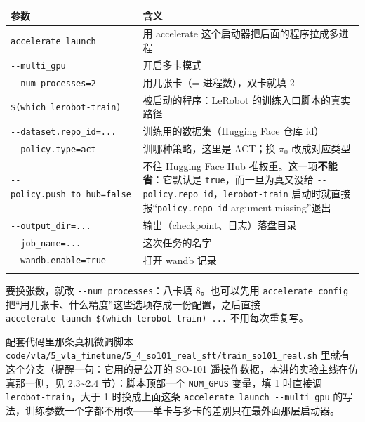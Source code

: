 \documentclass[
  chinese,
]{ctexart}
\begin{document}
\begin{center}
\begin{tabular}{@{}>{\raggedright\arraybackslash}p{} >{\raggedright\arraybackslash}p{}@{}}
\toprule\noalign{}
参数 & 含义 \\
\midrule\noalign{}
\texttt{accelerate\ launch} & 用 accelerate 这个启动器把后面的程序拉成多进程 \\
\texttt{-\/-multi\_\allowbreak gpu} & 开启多卡模式 \\
\texttt{-\/-num\_\allowbreak processes=2} & 用几张卡（= 进程数），双卡就填 2 \\
\texttt{\$(which\ lerobot-train)} & 被启动的程序：LeRobot 的训练入口脚本的真实路径 \\
\texttt{-\/-dataset.repo\_\allowbreak id=...} & 训练用的数据集（Hugging Face 仓库 id） \\
\texttt{-\/-policy.type=act} & 训哪种策略，这里是 ACT；换 \(\pi_0\) 改成对应类型 \\
\texttt{-\/-policy.push\_\allowbreak to\_\allowbreak hub=false} & 不往 Hugging Face Hub 推权重。这一项\textbf{不能省}：它默认是 \texttt{true}，而一旦为真又没给 \texttt{-\/-policy.repo\_\allowbreak id}，\texttt{lerobot-train} 启动时就直接报``\texttt{policy.repo\_\allowbreak id} argument missing''退出 \\
\texttt{-\/-output\_\allowbreak dir=...} & 输出（checkpoint、日志）落盘目录 \\
\texttt{-\/-job\_\allowbreak name=...} & 这次任务的名字 \\
\texttt{-\/-wandb.enable=true} & 打开 wandb 记录 \\
\bottomrule\noalign{}
\end{tabular}
\end{center}

要换张数，就改 \texttt{-\/-num\_processes}：八卡填 8。也可以先用
\texttt{accelerate\ config}
把``用几张卡、什么精度''这些选项存成一份配置，之后直接
\texttt{accelerate\ launch\ \$(which\ lerobot-train)\ ...}
不用每次重复写。

配套代码里那条真机微调脚本
\texttt{code/vla/5\_vla\_finetune/5\_4\_so101\_real\_sft/train\_so101\_real.sh}
里就有这个分支（提醒一句：它用的是公开的 SO-101
遥操作数据，本讲的实验主线在仿真那一侧，见 2.3\textasciitilde2.4
节）：脚本顶部一个 \texttt{NUM\_GPUS} 变量，填 1 时直接调
\texttt{lerobot-train}，大于 1 时换成上面这条
\texttt{accelerate\ launch\ -\/-multi\_gpu}
的写法，训练参数一个字都不用改------单卡与多卡的差别只在最外面那层启动器。
\end{document}
